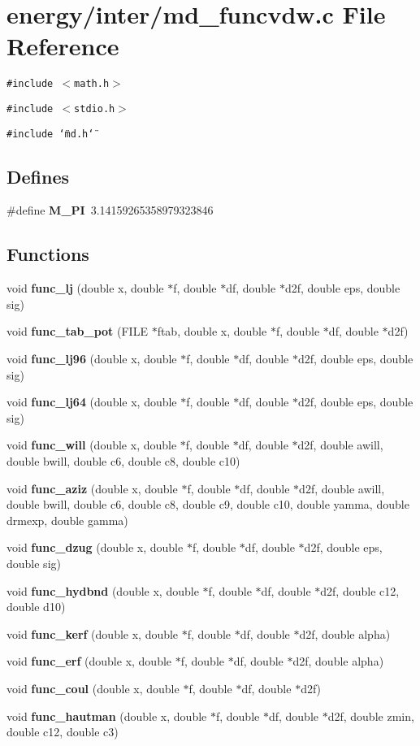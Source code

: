 \section{energy/inter/md\_\-funcvdw.c File Reference}
\label{energy_2inter_2md__funcvdw_8c}
{\tt \#include $<$math.h$>$}\par
{\tt \#include $<$stdio.h$>$}\par
{\tt \#include \char`\"{}md.h\char`\"{}}\par
\subsection*{Defines}
\begin{CompactItemize}
\item 
\#define {\bf M\_\-PI}~3.14159265358979323846
\end{CompactItemize}
\subsection*{Functions}
\begin{CompactItemize}
\item 
void {\bf func\_\-lj} (double x, double $\ast$f, double $\ast$df, double $\ast$d2f, double eps, double sig)
\item 
void {\bf func\_\-tab\_\-pot} (FILE $\ast$ftab, double x, double $\ast$f, double $\ast$df, double $\ast$d2f)
\item 
void {\bf func\_\-lj96} (double x, double $\ast$f, double $\ast$df, double $\ast$d2f, double eps, double sig)
\item 
void {\bf func\_\-lj64} (double x, double $\ast$f, double $\ast$df, double $\ast$d2f, double eps, double sig)
\item 
void {\bf func\_\-will} (double x, double $\ast$f, double $\ast$df, double $\ast$d2f, double awill, double bwill, double c6, double c8, double c10)
\item 
void {\bf func\_\-aziz} (double x, double $\ast$f, double $\ast$df, double $\ast$d2f, double awill, double bwill, double c6, double c8, double c9, double c10, double yamma, double drmexp, double gamma)
\item 
void {\bf func\_\-dzug} (double x, double $\ast$f, double $\ast$df, double $\ast$d2f, double eps, double sig)
\item 
void {\bf func\_\-hydbnd} (double x, double $\ast$f, double $\ast$df, double $\ast$d2f, double c12, double d10)
\item 
void {\bf func\_\-kerf} (double x, double $\ast$f, double $\ast$df, double $\ast$d2f, double alpha)
\item 
void {\bf func\_\-erf} (double x, double $\ast$f, double $\ast$df, double $\ast$d2f, double alpha)
\item 
void {\bf func\_\-coul} (double x, double $\ast$f, double $\ast$df, double $\ast$d2f)
\item 
void {\bf func\_\-hautman} (double x, double $\ast$f, double $\ast$df, double $\ast$d2f, double zmin, double c12, double c3)
\end{CompactItemize}
